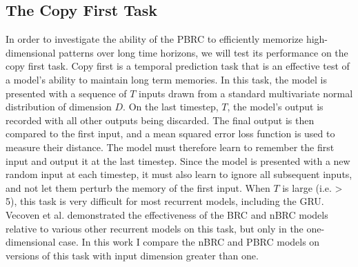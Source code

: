 \subsection*{The Copy First Task}

In order to investigate the ability of the PBRC to efficiently memorize high-dimensional patterns over long time horizons, we will test its performance on the copy first task.
Copy first is a temporal prediction task that is an effective test of a model's ability to maintain long term memories. In this task, the model is presented with a sequence of \(T\) inputs drawn from a standard multivariate normal distribution of dimension \(D\). On the last timestep, \(T\), the model's output is recorded with all other outputs being discarded. The final output is then compared to the first input, and a mean squared error loss function is used to measure their distance. The model must therefore learn to remember the first input and output it at the last timestep. Since the model is presented with a new random input at each timestep, it must also learn to ignore all subsequent inputs, and not let them perturb the memory of the first input. When \(T\) is large (i.e. > 5), this task is very difficult for most recurrent models, including the GRU. Vecoven et al.\cite{vecoven2021brc} demonstrated the effectiveness of the BRC and nBRC models relative to various other recurrent models on this task, but only in the one-dimensional case. In this work I compare the nBRC and PBRC models on versions of this task with input dimension greater than one.
